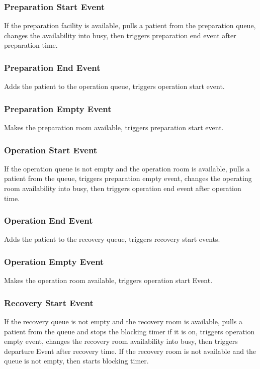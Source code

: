 \documentclass{article}
\begin{document}
\subsubsection{Preparation Start Event}
If the preparation facility is available, pulls a patient from the preparation queue, changes the availability into busy, then triggers 
preparation end event after preparation time.

\subsubsection{Preparation End Event}
Adds the patient to the operation queue, triggers operation start event.

\subsubsection{Preparation Empty Event}
Makes the preparation room available, triggers preparation start event.

\subsubsection{Operation Start Event}
If the operation queue is not empty and the operation room is available, pulls a patient from the queue, triggers preparation empty event, 
changes the operating room availability into busy, then triggers operation end event after operation time.

\subsubsection{Operation End Event}
Adds the patient to the recovery queue, triggers recovery start events.

\subsubsection{Operation Empty Event}
Makes the operation room available, triggers operation start Event.

\subsubsection{Recovery Start Event}
If the recovery queue is not empty and the recovery room is available, pulls a patient from the queue and stops the blocking timer if it is on, 
triggers operation empty event, changes the recovery room availability into busy, then triggers departure Event after recovery time. If the recovery 
room is not available and the queue is not empty, then starts blocking timer.
\end{document}
